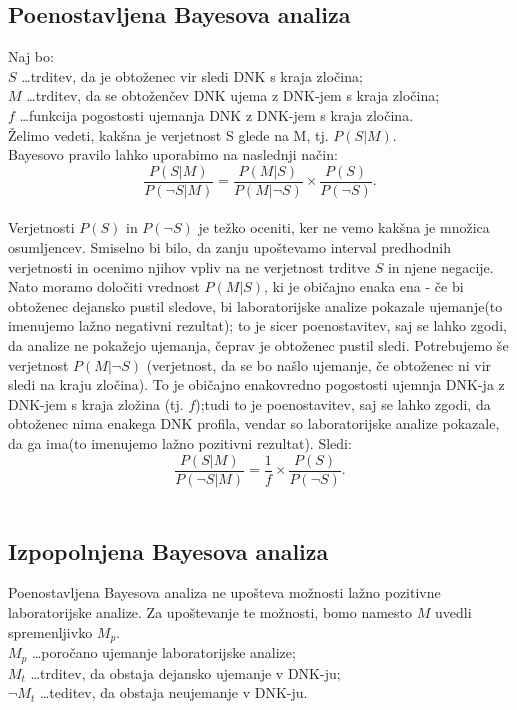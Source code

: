 \documentclass[12pt,a4paper]{amsart}
\theoremstyle{definition} %
\theoremstyle{plain} %
\begin{document}
\subsection{Poenostavljena Bayesova analiza}
Naj bo:\\
$S$ \dots trditev, da je obtoženec vir sledi DNK s kraja zločina; \\
$M$ \dots trditev, da se obtoženčev DNK ujema z DNK-jem s kraja zločina; \\
$f$ \dots funkcija pogostosti ujemanja DNK z DNK-jem s kraja zločina. \\
Želimo vedeti, kakšna je verjetnost S glede na M, tj. $P(S \lvert M)$. \\

Bayesovo pravilo lahko uporabimo na naslednji način:
\[\frac{P(S \lvert M)}{P(\neg S \lvert M)} = \frac{P(M \lvert S)}{P(M \lvert \neg S)} \times \frac{P(S)}{P(\neg S)}.\] \\
Verjetnosti $P(S)$ in $P(\neg S)$ je težko oceniti, ker ne vemo kakšna je množica osumljencev. Smiselno bi bilo, da zanju upoštevamo interval 
predhodnih verjetnosti in ocenimo njihov vpliv na ne verjetnost trditve $S$ in njene negacije. Nato moramo določiti vrednost $P(M \lvert S)$, ki 
je običajno enaka ena - če bi obtoženec dejansko pustil sledove, bi laboratorijske analize pokazale ujemanje(to imenujemo lažno 
negativni rezultat); to je sicer poenostavitev, saj se lahko zgodi, da analize ne pokažejo ujemanja, čeprav je obtoženec pustil sledi. 
Potrebujemo še verjetnost $P(M \lvert \neg S)$ (verjetnost, da se bo našlo ujemanje, če obtoženec ni vir sledi na kraju zločina). To je 
običajno enakovredno pogostosti ujemnja DNK-ja z DNK-jem s kraja zložina (tj. $f$);tudi to je poenostavitev, saj se lahko zgodi, da 
obtoženec nima enakega DNK profila, vendar so laboratorijske analize pokazale, da ga ima(to imenujemo lažno 
pozitivni rezultat).
Sledi:
\[\frac{P(S \lvert M)}{P(\neg S \lvert M)} = \frac{1}{f} \times \frac{P(S)}{P(\neg S)}.\] \\

\subsection{Izpopolnjena Bayesova analiza}
Poenostavljena Bayesova analiza ne upošteva možnosti lažno pozitivne laboratorijske analize. Za upoštevanje te možnosti, bomo namesto $M$ 
uvedli spremenljivko $M_p$.\\
$M_p$ \dots poročano ujemanje laboratorijske analize; \\
$M_t$ \dots trditev, da obstaja dejansko ujemanje v DNK-ju;\\
$\neg M_t$ \dots teditev, da obstaja neujemanje v DNK-ju.  \\ 
\end{document}
